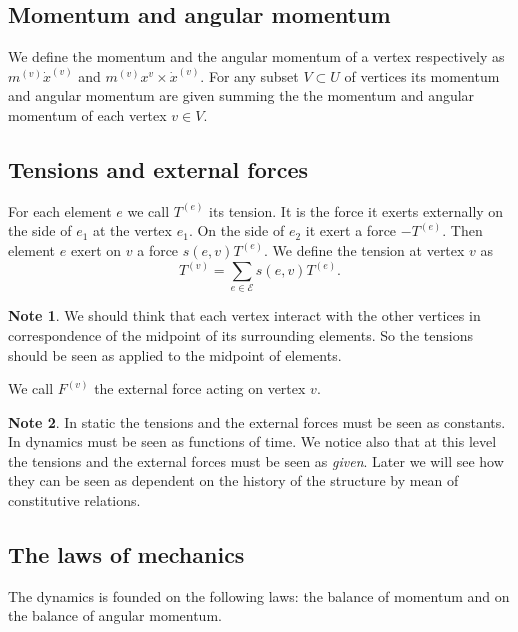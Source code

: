 \documentclass[a4paper,11pt]{article}
\theoremstyle{definition}
\newtheorem*{note}{Note}
\begin{document}
\subsection*{Momentum and angular momentum}

We define the momentum and the angular momentum of a vertex respectively as $m^{(v)}\dot{x}^{(v)}$ and $m^{(v)}x^{v}\times\dot{x}^{(v)}$. For any subset $V\subset U$ of vertices its momentum and angular momentum are given summing the the momentum and angular momentum of each vertex $v\in V$.

\subsection*{Tensions and external forces}

For each element $e$ we call $T^{(e)}$ its tension. It is the force it exerts externally on the side of $e_1$ at the vertex $e_1$. On the side of $e_2$ it exert a force $-T^{(e)}$. Then element $e$ exert on $v$ a force $s(e,v)T^{(e)}$. We define the tension at vertex $v$ as
\[
T^{(v)}=\sum_{e\in\mathscr{E}}s(e,v)T^{(e)}.
\]
\begin{note}
We should think that each vertex interact with the other vertices in correspondence of the midpoint of its surrounding elements. So the tensions should be seen as applied to the midpoint of elements.
\end{note}

We call $F^{(v)}$ the external force acting on vertex $v$.

\begin{note}
In static the tensions and the external forces must be seen as constants. In dynamics must be seen as functions of time. We notice also that at this level the tensions and the external forces must be seen as \emph{given}. Later we will see how they can be seen as dependent on the history of the structure by mean of constitutive relations.
\end{note}

\subsection*{The laws of mechanics}

The dynamics is founded on the following laws: the balance of momentum and on the balance of angular momentum.
\end{document}
